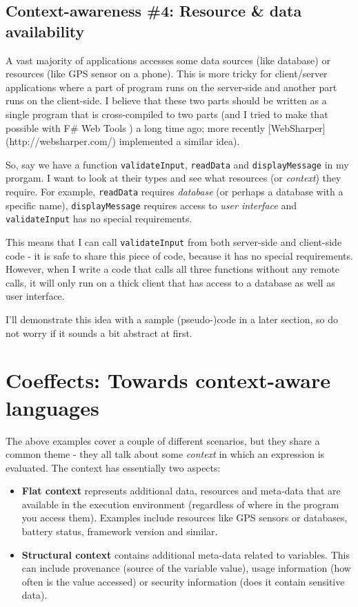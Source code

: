 \subsection{Context-awareness \#4: Resource \& data availability}

A vast majority of applications accesses some data sources (like database) or resources
(like GPS sensor on a phone). This is more tricky for client/server applications where a part
of program runs on the server-side and another part runs on the client-side. I believe that 
these two parts should be written as a single program that is cross-compiled to two parts 
(and I tried to make that possible with F\# Web Tools \cite{xx})
a long time ago; more recently [WebSharper](http://websharper.com/) implemented a similar idea).

So, say we have a function \texttt{validateInput}, \texttt{readData} and \texttt{displayMessage} in my prorgam.
I want to look at their types and see what resources (or \emph{context}) they require. For example,
\texttt{readData} requires \emph{database} (or perhaps a database with a specific name), \texttt{displayMessage} 
requires access to \emph{user interface} and \texttt{validateInput} has no special requirements.

This means that I can call \texttt{validateInput} from both server-side and client-side code - it is
safe to share this piece of code, because it has no special requirements. However, when I write
a code that calls all three functions without any remote calls, it will only run on a thick
client that has access to a database as well as user interface.

I'll demonstrate this idea with a sample (pseudo-)code in a later section, so do not worry if
it sounds a bit abstract at first.


\section{Coeffects: Towards context-aware languages}

The above examples cover a couple of different scenarios, but they share a common theme - 
they all talk about some \emph{context} in which an expression is evaluated. The context has 
essentially two aspects:

\begin{itemize}
\item \textbf{Flat context} represents additional data, resources and meta-data that are 
   available in the execution environment (regardless of where in the program you 
   access them). Examples include resources like GPS sensors or databases, battery status,
   framework version and similar. 

\item \textbf{Structural context} contains additional meta-data related to variables. This can include
   provenance (source of the variable value), usage information (how often is the value
   accessed) or security information (does it contain sensitive data). 
\end{itemize}


